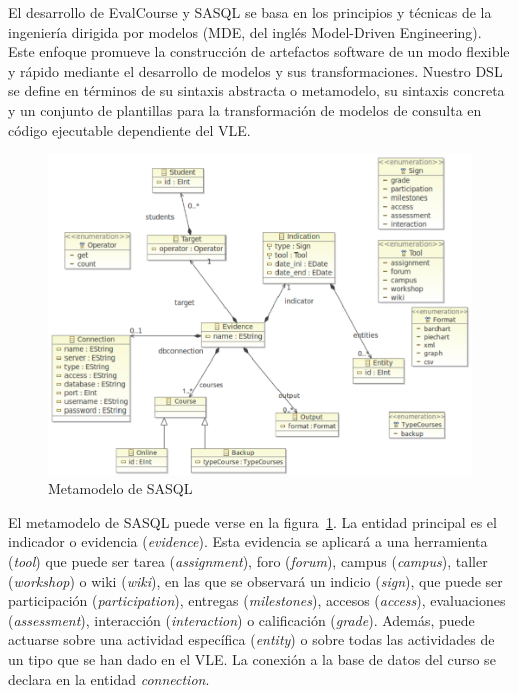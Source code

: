 			El desarrollo de EvalCourse y SASQL se basa en los principios y técnicas de la ingeniería dirigida por modelos (MDE, del inglés Model-Driven Engineering). Este enfoque promueve la construcción de artefactos software de un modo flexible y rápido mediante el desarrollo de modelos y sus transformaciones. Nuestro DSL se define en términos de su sintaxis abstracta o metamodelo, su sintaxis concreta y un conjunto de plantillas para la transformación de modelos de consulta en código ejecutable dependiente del VLE.

\begin{figure}
  \begin{center}
    \includegraphics[scale=0.4]{EvcMetamodel.png}
  \end{center}
  \caption{Metamodelo de SASQL}
  \label{fig:EvcMetamodel}
\end{figure}

			El metamodelo de SASQL puede verse en la figura~\ref{fig:EvcMetamodel}. La entidad principal es el indicador o evidencia (\emph{evidence}). Esta evidencia se aplicará a una herramienta (\emph{tool}) que puede ser tarea (\emph{assignment}), foro (\emph{forum}), campus (\emph{campus}), taller (\emph{workshop}) o wiki (\emph{wiki}), en las que se observará un indicio (\emph{sign}), que puede ser participación (\emph{participation}), entregas (\emph{milestones}), accesos (\emph{access}), evaluaciones (\emph{assessment}), interacción (\emph{interaction}) o calificación (\emph{grade}). Además, puede actuarse sobre una actividad específica (\emph{entity}) o sobre todas las actividades de un tipo que se han dado en el VLE. La conexión a la base de datos del curso se declara en la entidad \emph{connection}. 

